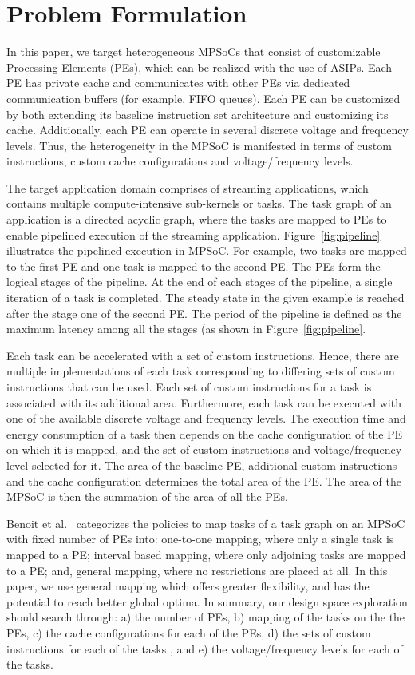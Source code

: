 \section{Problem Formulation}
\label{sec:problem_statement}

In this paper, we target heterogeneous MPSoCs that consist of
customizable Processing Elements (PEs), which can be realized with the
use of ASIPs. Each PE has private cache and communicates with other PEs
via dedicated communication buffers (for example, FIFO queues). Each
PE can be customized by both extending its baseline instruction set
architecture and customizing its cache. Additionally, each PE can operate
in several discrete voltage and frequency levels. Thus, the heterogeneity
in the MPSoC is manifested in terms of custom instructions, custom cache
configurations and voltage/frequency levels.

The target application domain comprises of streaming applications, which
contains multiple compute-intensive sub-kernels or tasks. The task graph
of an application is a directed acyclic graph, where the tasks are
mapped to PEs to enable pipelined execution of the streaming application. 
Figure~\ref{fig:pipeline} illustrates the pipelined execution in MPSoC. For example, two tasks are mapped to the first PE and one task is mapped to the second PE. The PEs form the logical stages of the pipeline. At the end of each stages of the pipeline, a single iteration of a task is completed. The steady state in the given example is reached after the stage one of the second PE. The period of the pipeline is defined as the maximum latency among all the stages (as shown in Figure~\ref{fig:pipeline}. 

Each task can be accelerated with a set of custom instructions. Hence, there are multiple
implementations of each task corresponding to differing sets of custom
instructions that can be used. Each set of custom instructions for a
task is associated with its additional area. Furthermore, each task can
be executed with one of the available discrete voltage and frequency
levels. The execution time and energy consumption of a task then depends
on the cache configuration of the PE on which it is mapped, and the set
of custom instructions and voltage/frequency level selected for it. The
area of the baseline PE, additional custom instructions and the cache
configuration determines the total area of the PE. The area of the
MPSoC is then the summation of the area of all the PEs.

Benoit et al.~\cite{general_mapping} categorizes the policies to map tasks of a task
graph on an MPSoC with fixed number of PEs into: one-to-one mapping,
where only a single task is mapped to a PE; interval based mapping, where
only adjoining tasks are mapped to a PE; and, general mapping, where no
restrictions are placed at all. In this paper, we use general mapping
which offers greater flexibility, and has the potential to reach better
global optima. In summary, our design space exploration should
search through: a) the number of PEs, b) mapping of the tasks on the
the PEs, c) the cache configurations for each of the PEs, d) the sets of
custom instructions for each of the tasks , and e) the voltage/frequency
levels for each of the tasks.

